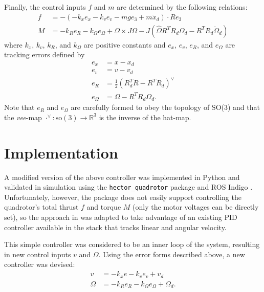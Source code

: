 \documentclass[paper=letter, fontsize=11pt]{scrartcl} %
\numberwithin{equation}{section} %
\numberwithin{figure}{section} %
\numberwithin{table}{section} %
\begin{document}
Finally, the control inputs $f$ and $m$ are determined by the following relations:
\begin{align}
  f &= -(-k_x e_x - k_v e_v -m g e_3 + m \ddot{x}_d) \cdot Re_3 \\
  M &= -k_R e_R - k_{\Omega} e_{\Omega} + \Omega \times J \Omega
       - J(\hat{\Omega}R^TR_d \Omega_d - R^TR_d \dot{\Omega}_d)
\end{align}
where $k_x$, $k_v$, $k_R$, and $k_{\Omega}$ are positive constants and
$e_x$, $e_v$, $e_R$, and $e_{\Omega}$ are tracking errors defined by
\begin{align}
  e_x &= x - x_d \\
  e_v &= v - v_d \\
  e_R &= \frac{1}{2}(R_d^TR - R^TR_d)^{\vee} \\
  e_{\Omega} &= \Omega - R^TR_d \Omega_d.
\end{align}
Note that $e_R$ and $e_{\Omega}$ are carefully formed to obey the topology of
SO(3) and that the \textit{vee}-map $\cdot^{\vee}: \textrm{so}(3) \rightarrow \mathbb{R}^3$ is the
inverse of the hat-map.


\section{Implementation}
A modified version of the above controller was implemented in Python and validated
in simulation using the \texttt{hector\_quadrotor} package \cite{2012simpar_meyer}
and ROS Indigo \cite{quigley2009ros}.
Unfortunately, however, the package does not easily support controlling the quadrotor's total
thrust $f$ and torque $M$ (only the motor voltages can be directly set), so
the approach in \cite{lee2010geometric} was adapted
to take advantage of an existing PID controller available in the
stack that tracks linear and angular velocity.

This simple controller was considered to be an inner loop
of the system, resulting in new control inputs $v$ and $\Omega$. Using the
error forms described above, a new controller was devised:
\begin{align}
  v &= -k_x e - k_v e_v + v_d \\
  \Omega &= -k_R e_R - k_{\Omega} e_{\Omega} + \Omega_d.
\end{align}
\end{document}
